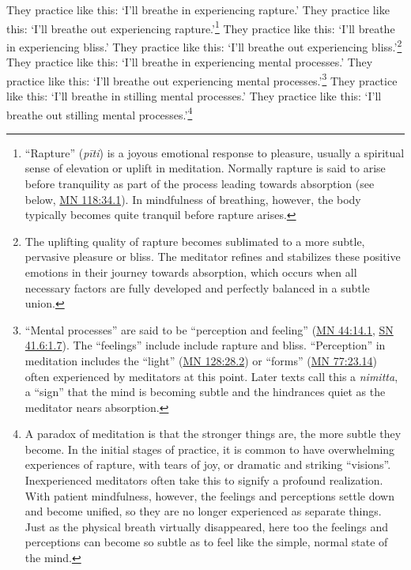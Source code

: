 \documentclass[12pt,openany]{book}%
\begin{document}
They practice like this: ‘I’ll breathe in experiencing rapture.’ They practice like this: ‘I’ll breathe out experiencing rapture.’\footnote{“Rapture” (\textit{\textsanskrit{pīti}}) is a joyous emotional response to pleasure, usually a spiritual sense of elevation or uplift in meditation. Normally rapture is said to arise before tranquility as part of the process leading towards absorption (see below, \href{https://suttacentral.net/mn118/en/sujato\#34.1}{MN 118:34.1}). In mindfulness of breathing, however, the body typically becomes quite tranquil before rapture arises. } They practice like this: ‘I’ll breathe in experiencing bliss.’ They practice like this: ‘I’ll breathe out experiencing bliss.’\footnote{The uplifting quality of rapture becomes sublimated to a more subtle, pervasive pleasure or bliss. The meditator refines and stabilizes these positive emotions in their journey towards absorption, which occurs when all necessary factors are fully developed and perfectly balanced in a subtle union. } They practice like this: ‘I’ll breathe in experiencing mental processes.’ They practice like this: ‘I’ll breathe out experiencing mental processes.’\footnote{“Mental processes” are said to be “perception and feeling” (\href{https://suttacentral.net/mn44/en/sujato\#14.1}{MN 44:14.1}, \href{https://suttacentral.net/sn41.6/en/sujato\#1.7}{SN 41.6:1.7}). The “feelings” include include rapture and bliss. “Perception” in meditation includes the “light” (\href{https://suttacentral.net/mn128/en/sujato\#28.2}{MN 128:28.2}) or “forms” (\href{https://suttacentral.net/mn77/en/sujato\#23.14}{MN 77:23.14}) often experienced by meditators at this point. Later texts call this a \textit{nimitta}, a “sign” that the mind is becoming subtle and the hindrances quiet as the meditator nears absorption. } They practice like this: ‘I’ll breathe in stilling mental processes.’ They practice like this: ‘I’ll breathe out stilling mental processes.’\footnote{A paradox of meditation is that the stronger things are, the more subtle they become. In the initial stages of practice, it is common to have overwhelming experiences of rapture, with tears of joy, or dramatic and striking “visions”. Inexperienced meditators often take this to signify a profound realization. With patient mindfulness, however, the feelings and perceptions settle down and become unified, so they are no longer experienced as separate things. Just as the physical breath virtually disappeared, here too the feelings and perceptions can become so subtle as to feel like the simple, normal state of the mind. } 
\end{document}
